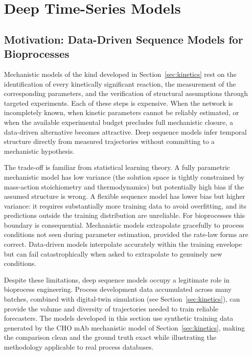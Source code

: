\section{Deep Time-Series Models}\label{sec:dl}

\subsection{Motivation: Data-Driven Sequence Models for Bioprocesses}

Mechanistic models of the kind developed in Section~\ref{sec:kinetics} rest on
the identification of every kinetically significant reaction, the measurement
of the corresponding parameters, and the verification of structural assumptions
through targeted experiments.  Each of these steps is expensive.  When the
network is incompletely known, when kinetic parameters cannot be reliably
estimated, or when the available experimental budget precludes full mechanistic
closure, a data-driven alternative becomes attractive.  Deep sequence models
infer temporal structure directly from measured trajectories without
committing to a mechanistic hypothesis.

The trade-off is familiar from statistical learning theory.  A fully
parametric mechanistic model has low variance (the solution space is tightly
constrained by mass-action stoichiometry and thermodynamics) but potentially
high bias if the assumed structure is wrong.  A flexible sequence model has
lower bias but higher variance: it requires substantially more training data
to avoid overfitting, and its predictions outside the training distribution
are unreliable.  For bioprocesses this boundary is consequential.
Mechanistic models extrapolate gracefully to process conditions not seen during
parameter estimation, provided the rate-law forms are correct.  Data-driven
models interpolate accurately within the training envelope but can fail
catastrophically when asked to extrapolate to genuinely new conditions.

Despite these limitations, deep sequence models occupy a legitimate role in
bioprocess engineering.  Process development data accumulated across many
batches, combined with digital-twin simulation (see Section~\ref{sec:kinetics}),
can provide the volume and diversity of trajectories needed to train reliable
forecasters.  The models developed in this section use synthetic training data
generated by the CHO mAb mechanistic model of Section~\ref{sec:kinetics},
making the comparison clean and the ground truth exact while illustrating the
methodology applicable to real process databases.

